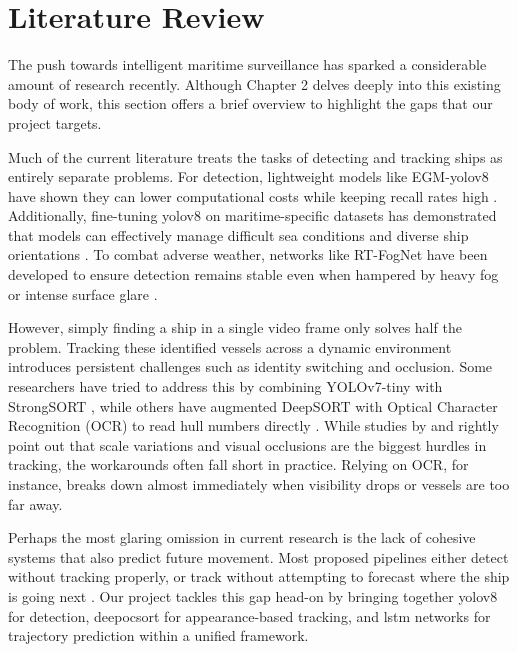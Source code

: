 \section{Literature Review}
The push towards intelligent maritime surveillance has sparked a considerable amount of research recently. Although Chapter 2 delves deeply into this existing body of work, this section offers a brief overview to highlight the gaps that our project targets.

Much of the current literature treats the tasks of detecting and tracking ships as entirely separate problems. For detection, lightweight models like EGM-\gls{yolov8} have shown they can lower computational costs while keeping recall rates high \parencite{Li2024, Li2025}. Additionally, fine-tuning \gls{yolov8} on maritime-specific datasets has demonstrated that models can effectively manage difficult sea conditions and diverse ship orientations \parencite{Jian2024, Jian2025}. To combat adverse weather, networks like RT-FogNet have been developed to ensure detection remains stable even when hampered by heavy fog or intense surface glare \parencite{Yuan2024, Yuan2026}.

However, simply finding a ship in a single video frame only solves half the problem. Tracking these identified vessels across a dynamic environment introduces persistent challenges such as identity switching and occlusion. Some researchers have tried to address this by combining YOLOv7-tiny with StrongSORT \parencite{Hao2025}, while others have augmented DeepSORT with Optical Character Recognition (OCR) to read hull numbers directly \parencite{Ma2024, Ma2026}. While studies by \cite{Zhang2024Survey} and \cite{Zhang2025} rightly point out that scale variations and visual occlusions are the biggest hurdles in tracking, the workarounds often fall short in practice. Relying on OCR, for instance, breaks down almost immediately when visibility drops or vessels are too far away.

Perhaps the most glaring omission in current research is the lack of cohesive systems that also predict future movement. Most proposed pipelines either detect without tracking properly, or track without attempting to forecast where the ship is going next \parencite{Hao2025, Zhang2025, Li2025, Jian2025, Ma2026, Yuan2026}. Our project tackles this gap head-on by bringing together \gls{yolov8} for detection, \gls{deepocsort} for appearance-based tracking, and \gls{lstm} networks for trajectory prediction within a unified framework.

